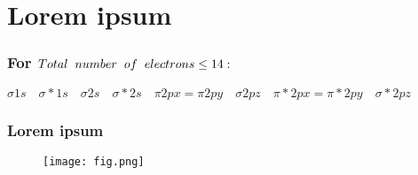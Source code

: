 \chapter{Lorem ipsum}
        \subsection{For \(Total \hspace{0.2cm} number \hspace{0.2cm} of \hspace{0.2cm} electrons \leq 14:\)}
                \begin{center}
                        \(\sigma1s \quad \sigma*1s \quad \sigma2s \quad \sigma*2s \quad \pi2px=\pi2py \quad \sigma2pz \quad \pi*2px=\pi*2py \quad \sigma*2pz\)
                \end{center}

        \subsection{Lorem ipsum}
                \begin{figure}[h]
                        \centering
                        \texttt{[image: fig.png]}
                \end{figure}

